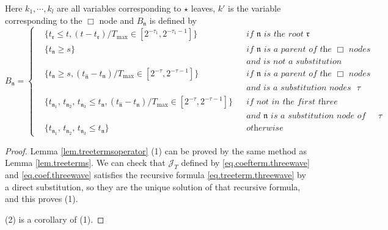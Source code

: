 \begin{lem}
\begin{equation}
\end{equation}
Here $k_1,\cdots,k_{l}$ are all variables corresponding to $\star$ leaves, $k'$ is the variable corresponding to the $\Box$ node and $B_{\mathfrak{n}}$ is defined by 
\begin{equation}
    B_{\mathfrak{n}}=\left\{
    \begin{aligned}
        &\{t_{\mathfrak{r}}\le t, (t-t_{\mathfrak{r}})/T_{\text{max}}\in [2^{-\tau_{1}},2^{-\tau_{1}-1}]\} && \textit{if $\mathfrak{n}$ is the root $\mathfrak{r}$ }
        \\
        &\{t_{\mathfrak{n}}\ge s\} && \textit{if $\mathfrak{n}$ is a parent of the $\Box$ nodes}
        \\
        &\  &&\textit{and is not a substitution nodes}
        \\
        &\{t_{\mathfrak{n}}\ge s, (t_{\widehat{\mathfrak{n}}}-t_{\mathfrak{n}})/T_{\text{max}}\in [2^{-\tau},2^{-\tau-1}]\} && \textit{if $\mathfrak{n}$ is a parent of the $\Box$ nodes}
        \\
        &\  &&\textit{and is a substitution nodes of index $\tau$}
        \\
        &\{t_{\mathfrak{n}_1},\, t_{\mathfrak{n}_2},\, t_{\mathfrak{n}_3}\le t_{\mathfrak{n}}, (t_{\widehat{\mathfrak{n}}}-t_{\mathfrak{n}})/T_{\text{max}}\in [2^{-\tau},2^{-\tau-1}]\}  &&\textit{if not in the first three cases}
        \\
        &\  &&\textit{and $\mathfrak{n}$ is a substitution node of index $\tau$}
        \\
        &\{t_{\mathfrak{n}_1},\, t_{\mathfrak{n}_2},\, t_{\mathfrak{n}_3}\le t_{\mathfrak{n}}\} && \textit{otherwise}
    \end{aligned}\right.
\end{equation}
\end{lem}
\begin{proof}
Lemma \ref{lem.treetermsoperator} (1) can be proved by the same method as Lemma \ref{lem.treeterms}. We can check that $\mathcal{J}_T$ defined by \eqref{eq.coefterm.threewave} and \eqref{eq.coef.threewave} satisfies the recursive formula \eqref{eq.treeterm.threewave} by a direct substitution, so they are the unique solution of that recursive formula, and this proves (1).

(2) is a corollary of (1).
\end{proof}

